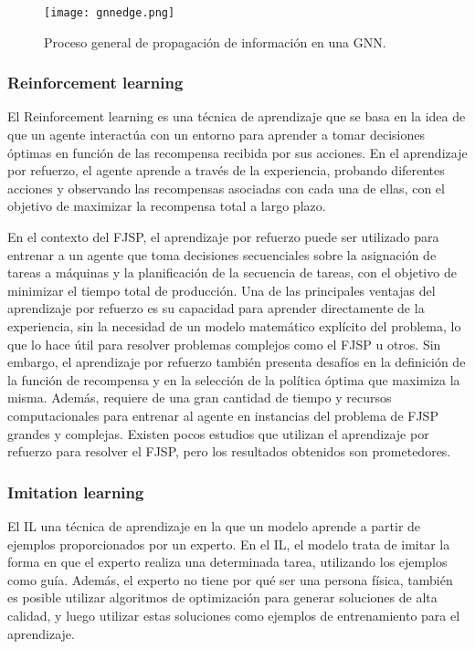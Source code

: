 \begin{figure}[ht]
      \centering
      \texttt{[image: gnnedge.png]}
      \caption{Proceso general de propagación de información en una GNN\cite{DeepFindr_2021}.}\label{fig:gnn-edge}
\end{figure}

\subsubsection{Reinforcement learning}
El Reinforcement learning\cite{Bhatt_2018}\cite{Huggingface_DeepRL} es una
técnica de aprendizaje que se basa en la idea de que un agente interactúa con
un entorno para aprender a tomar decisiones óptimas en función de las
recompensa recibida por sus acciones. En el aprendizaje por refuerzo, el agente
aprende a través de la experiencia, probando diferentes acciones y observando
las recompensas asociadas con cada una de ellas, con el objetivo de maximizar
la recompensa total a largo plazo.\medskip

En el contexto del FJSP, el aprendizaje por refuerzo puede ser utilizado para
entrenar a un agente que toma decisiones secuenciales sobre la asignación de
tareas a máquinas y la planificación de la secuencia de tareas, con el objetivo
de minimizar el tiempo total de producción. Una de las principales ventajas del
aprendizaje por refuerzo es su capacidad para aprender directamente de la
experiencia, sin la necesidad de un modelo matemático explícito del problema,
lo que lo hace útil para resolver problemas complejos como el FJSP u otros. Sin
embargo, el aprendizaje por refuerzo también presenta desafíos en la definición
de la función de recompensa y en la selección de la política óptima que
maximiza la misma. Además, requiere de una gran cantidad de tiempo y recursos
computacionales para entrenar al agente en instancias del problema de FJSP
grandes y complejas. Existen pocos estudios que utilizan el aprendizaje por
refuerzo para resolver el FJSP, pero los resultados obtenidos son prometedores.

\subsubsection{Imitation learning}
El IL\cite{SmartLab_2019} una técnica de aprendizaje en la que un modelo aprende a partir de 
ejemplos proporcionados por un experto. En el IL, el modelo trata de imitar 
la forma en que el experto realiza una determinada tarea, utilizando los 
ejemplos como guía. Además, el experto no tiene por qué ser una persona física, 
también es posible utilizar algoritmos de optimización para generar soluciones 
de alta calidad, y luego utilizar estas soluciones como ejemplos de entrenamiento 
para el aprendizaje.\medskip


